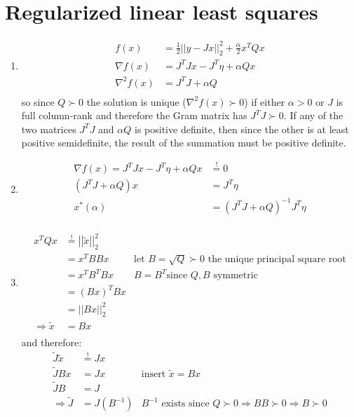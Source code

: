 \documentclass[oneside, a4paper]{book}
\newcommand\abss[1]{\left|\left|#1\right|\right|}
\newcommand\br[1]{\left(#1\right)}
\begin{document}
\section{Regularized linear least squares}
\begin{enumerate}
  \item \begin{align*}
    f(x) &= \frac{1}{2} \abss{y - Jx}_2^2 + \frac{\alpha}{2}x^T Q x\\
    \nabla f(x) &= J^T J x - J^T\eta + \alpha Q x\\
    \nabla^2 f(x) &= J^T J + \alpha Q\\
  \end{align*}
  so since $Q\succ 0$ the solution is unique ($\nabla^2f(x)\succ 0$) if either $\alpha>0$ or $J$ is full column-rank and therefore the Gram matrix has $J^T J\succ 0$. If any of the two matrices $J^T J$ and $\alpha Q$ is positive definite, then since the other is at least positive semidefinite, the result of the summation must be positive definite.
  \item \begin{align*}
  \nabla f(x) = J^T J x - J^T\eta + \alpha Q x &\overset{!}{=} 0\\
  (J^T J + \alpha Q) x &= J^T\eta\\
  x^*(\alpha) &= (J^T J + \alpha Q)^{-1} J^T\eta\\
  \end{align*}
  \item \begin{align*}
    x^T Q x &\overset{!}{=} \abss{\tilde{x}}_2^2\\
    &= x^T B B x &\text{let $B=\sqrt{Q}\succ 0$ the unique principal square root}\\
    &= x^T B^T B x &B = B^T \text{since $Q,B$ symmetric}\\
    &= (B x)^T B x &\\
    &= \abss{B x}_2^2 &\\
    \Longrightarrow \tilde{x} &= Bx\\
  \end{align*}
  and therefore:
  \begin{align*}
    \tilde{J}\tilde{x} &\overset{!}{=} J x \\
    \tilde{J}B x &= J x &\text{insert $\tilde{x} = Bx$} \\
    \tilde{J}B &= J\\
    \Longrightarrow \tilde{J} &= J \br{B^{-1}} &\text{$B^{-1}$ exists since $Q\succ 0\Longrightarrow B B \succ 0 \Longrightarrow B \succ 0$}\\

\end{align*}
\end{enumerate}
\end{document}

